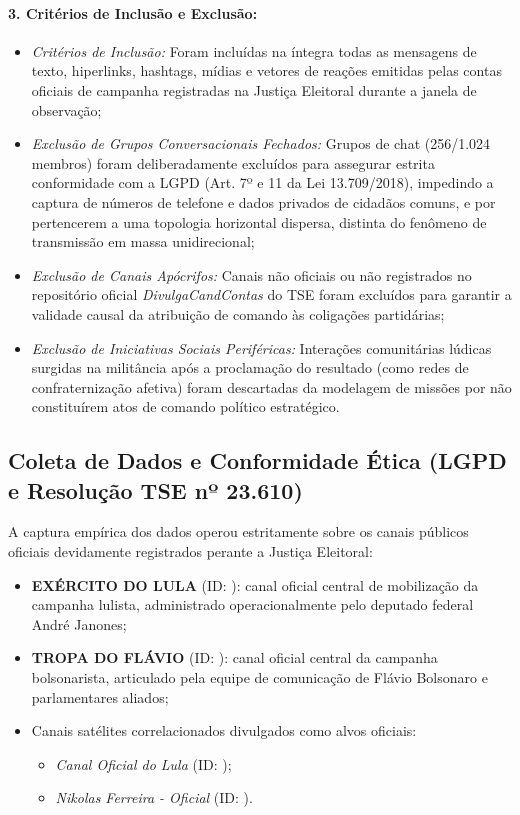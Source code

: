\documentclass[12pt]{article}
\begin{document}
\paragraph{3. Critérios de Inclusão e Exclusão:}
\begin{itemize}
    \item \textit{Critérios de Inclusão:} Foram incluídas na íntegra todas as mensagens de texto, hiperlinks, hashtags, mídias e vetores de reações emitidas pelas contas oficiais de campanha registradas na Justiça Eleitoral durante a janela de observação;
    \item \textit{Exclusão de Grupos Conversacionais Fechados:} Grupos de chat (256/1.024 membros) foram deliberadamente excluídos para assegurar estrita conformidade com a LGPD (Art. 7º e 11 da Lei 13.709/2018), impedindo a captura de números de telefone e dados privados de cidadãos comuns, e por pertencerem a uma topologia horizontal dispersa, distinta do fenômeno de transmissão em massa unidirecional;
    \item \textit{Exclusão de Canais Apócrifos:} Canais não oficiais ou não registrados no repositório oficial \textit{DivulgaCandContas} do TSE foram excluídos para garantir a validade causal da atribuição de comando às coligações partidárias;
    \item \textit{Exclusão de Iniciativas Sociais Periféricas:} Interações comunitárias lúdicas surgidas na militância após a proclamação do resultado (como redes de confraternização afetiva) foram descartadas da modelagem de missões por não constituírem atos de comando político estratégico.
\end{itemize}

\subsection{Coleta de Dados e Conformidade Ética (LGPD e Resolução TSE nº 23.610)}
A captura empírica dos dados operou estritamente sobre os canais públicos oficiais devidamente registrados perante a Justiça Eleitoral:
\begin{itemize}
    \item \textbf{EXÉRCITO DO LULA} (ID: ): canal oficial central de mobilização da campanha lulista, administrado operacionalmente pelo deputado federal André Janones;
    \item \textbf{TROPA DO FLÁVIO} (ID: ): canal oficial central da campanha bolsonarista, articulado pela equipe de comunicação de Flávio Bolsonaro e parlamentares aliados;
    \item Canais satélites correlacionados divulgados como alvos oficiais:
    \begin{itemize}
        \item \textit{Canal Oficial do Lula} (ID: );
        \item \textit{Nikolas Ferreira - Oficial} (ID: ).
    \end{itemize}
\end{itemize}
\end{document}
